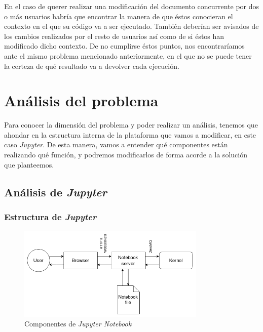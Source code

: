 \documentclass[11pt,spanish,listoffigures]{tfgetsinf}
\begin{document}
En el caso de querer realizar una modificación del documento concurrente por dos o más usuarios habría que encontrar la manera de que éstos conocieran el contexto en el que su código va a ser ejecutado. También deberían ser avisados de los cambios realizados por el resto de usuarios así como de si éstos han modificado dicho contexto. De no cumplirse éstos puntos, nos encontraríamos ante el mismo problema mencionado anteriormente, en el que no se puede tener la certeza de qué resultado va a devolver cada ejecución.




\chapter{Análisis del problema}
\label{ch:analisis-problema}

Para conocer la dimensión del problema y poder realizar un análisis, tenemos que ahondar en la estructura interna de la plataforma que vamos a modificar, en este caso \textit{Jupyter}. De esta manera, vamos a entender qué componentes están realizando qué función, y podremos modificarlos de forma acorde a la solución que planteemos.



\section{Análisis de \textit{Jupyter}}
\label{sec:analisis-jupyter}


\subsection{Estructura de \textit{Jupyter}}
\label{subsec:estructura-jupyter}

\begin{figure}[h]
  \centering
  \includegraphics[width=0.8\textwidth]{jupy.png}
  \caption{Componentes de \textit{Jupyter Notebook}}
  \label{fig:components}
\end{figure}
\end{document}
